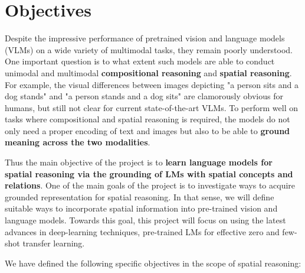 \section{Objectives}

Despite the impressive performance of pretrained vision and language models (VLMs) on a wide variety of multimodal tasks, they remain poorly understood. One important question is to what extent such models are able to conduct unimodal and multimodal \textbf{compositional reasoning} and \textbf{spatial reasoning}. For example, the visual differences between images depicting "a person sits and a dog stands" and "a person stands and a dog sits" are clamorously obvious for humans, but still not clear for current state-of-the-art VLMs. To perform well on tasks where compositional and spatial reasoning is required, the models do not only need a proper encoding of text and images but also to be able to \textbf{ground meaning across the two modalities}.

Thus the main objective of the project is to \textbf{learn language models for spatial reasoning via the grounding of LMs with spatial concepts and relations}. One of the main goals of the project is to investigate ways to acquire grounded representation for spatial reasoning. In that sense, we will define suitable ways to incorporate spatial information into pre-trained vision and language models. Towards this goal, this project will focus on using the latest advances in deep-learning techniques, pre-trained LMs for effective zero and few-shot transfer learning.

We have defined the following specific objectives in the scope of spatial reasoning:

